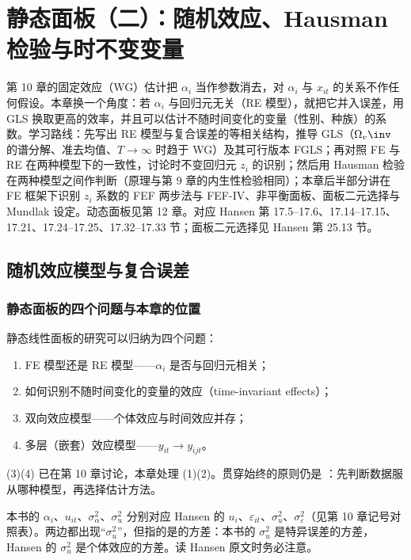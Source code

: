 \chapter{静态面板（二）：随机效应、Hausman 检验与时不变变量}
\label{ch:U11a-panel2}

第 10 章的固定效应（WG）估计把 $\alpha_i$ 当作参数消去，对 $\alpha_i$ 与 $x_{it}$ 的关系不作任何假设。本章换一个角度：若 $\alpha_i$ 与回归元无关（RE 模型），就把它并入误差，用 GLS 换取更高的效率，并且可以估计不随时间变化的变量（性别、种族）的系数。学习路线：先写出 RE 模型与复合误差的等相关结构，推导 GLS（$\Omega_v\inv$ 的谱分解、准去均值、$T\to\infty$ 时趋于 WG）及其可行版本 FGLS；再对照 FE 与 RE 在两种模型下的一致性，讨论时不变回归元 $z_i$ 的识别；然后用 Hausman 检验在两种模型之间作判断（原理与第 9 章的内生性检验相同）；本章后半部分讲在 FE 框架下识别 $z_i$ 系数的 FEF 两步法与 FEF-IV、非平衡面板、面板二元选择与 Mundlak 设定。动态面板见第 12 章。对应 Hansen 第 17.5–17.6、17.14–17.15、17.21、17.24–17.25、17.32–17.33 节；面板二元选择见 Hansen 第 25.13 节。

\section{随机效应模型与复合误差}\label{sec:U11a-re}

\subsection{静态面板的四个问题与本章的位置}

静态线性面板的研究可以归纳为四个问题：
\begin{enumerate}
  \item FE 模型还是 RE 模型——$\alpha_i$ 是否与回归元相关；
  \item 如何识别不随时间变化的变量的效应（time-invariant effects）；
  \item 双向效应模型——个体效应与时间效应并存；
  \item 多层（嵌套）效应模型——$y_{it}\to y_{ijt}$。
\end{enumerate}
(3)(4) 已在第 10 章讨论，本章处理 (1)(2)。贯穿始终的原则仍是 ：先判断数据服从哪种模型，再选择估计方法。

\begin{note}
本书的 $\alpha_i$、$u_{it}$、$\sigma_\alpha^2$、$\sigma_u^2$ 分别对应 Hansen 的 $u_i$、$\varepsilon_{it}$、$\sigma_u^2$、$\sigma_\varepsilon^2$（见第 10 章记号对照表）。两边都出现“$\sigma_u^2$”，但指的是的方差：本书的 $\sigma_u^2$ 是特异误差的方差，Hansen 的 $\sigma_u^2$ 是个体效应的方差。读 Hansen 原文时务必注意。
\end{note}

